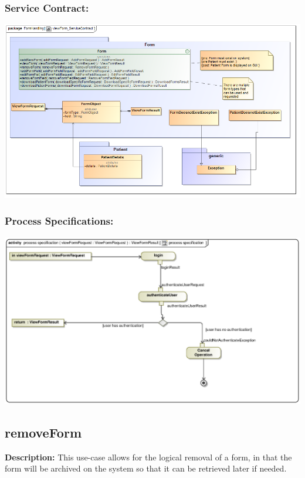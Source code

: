 \subsubsection{Service Contract:} 
\includegraphics[width=1\linewidth]{./Graphics/FormUseCaseDiagrams/viewForm_ServiceContract}
\subsubsection{Process Specifications:} 
\includegraphics[width=1\linewidth]{./Graphics/FormUseCaseDiagrams/processspecification_ViewForm}






\subsection{removeForm}
\textbf{Description:}
This use-case allows for the logical removal of a form, in that the form will be archived on the system so that it can be retrieved later if needed.

